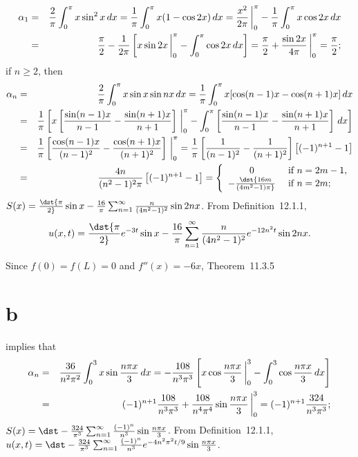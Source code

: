 \documentclass[dvips]{book}
\renewcommand{\exer}[1]{\par\medskip\;\noindent{\color{red}\bf #1.}}
\numberwithin{example}{section}
\numberwithin{equation}{section}
\numberwithin{theorem}{section}
\numberwithin{table}{section}
\numberwithin{figure}{section}
\newcommand{\lims}[2]{\,\bigg|_{#1}^{#2}}
\begin{document}
\exer{12.1.10}
\begin{eqnarray*}
\alpha_1&=&{2\over\pi}\int_0^\pi x\sin^2 x\,dx=
{1\over \pi}\int_0^\pi x(1-\cos2x)\,dx
={x^2\over2\pi}\lims0\pi
-{1\over\pi}\int_0^\pi x\cos2x\,dx\\
&=&{\pi\over2}-{1\over2\pi}\left[x\sin2x\lims0\pi-\int_0^\pi
\cos2x\,dx\right]
={\pi\over2}+{\sin2x\over4\pi}\lims0\pi={\pi\over2};
\end{eqnarray*}
if $n\ge2$, then
\begin{eqnarray*}
\alpha_n&=&
{2\over\pi}\int_0^\pi x\sin x\sin nx\,dx
={1\over\pi}\int_0^\pi x[\cos(n-1)x-\cos(n+1)x]\,dx\\
&=&{1\over\pi}\left[x\left[{\sin(n-1)x\over n-1}-
{\sin(n+1)x\over n+1}\right]\lims0\pi-\int_0^\pi
\left[{\sin(n-1)x\over n-1}-{\sin(n+1)x\over n+1}\right]\,dx\right]\\
&=&{1\over\pi}\left[{\cos(n-1)x \over(n-1)^2}
-{\cos(n+1)x\over(n+1)^2}\right]\lims0\pi
={1\over\pi}\left[{1\over(n-1)^2}-{1\over(n+1)^2}\right]
\left[(-1)^{n+1}-1\right]\\
&=&{4n\over(n^2-1)^2\pi}\left[(-1)^{n+1}-1\right]=
\left\{\begin{array}{cl}
0& \mbox{ if }n=2m-1,\\
-\dst{16m\over(4m^2-1)\pi}&\mbox{ if }n=2m;
\end{array}\right.
\end{eqnarray*}
$S(x)=\dst{\pi\over2}\sin
x-{16\over\pi}\sum_{n=1}^\infty{n\over(4n^2-1)^2}\sin2nx$.
From Definition~12.1.1,
$$
u(x,t)=\dst{\pi\over2}e^{-3t}\sin
x-{16\over\pi}\sum_{n=1}^\infty{n\over(4n^2-1)^2}e^{-12n^2t}\sin2nx.
$$



\exer{12.1.12}
Since $f(0)=f(L)=0$ and $f''(x)=-6x$, Theorem~11.3.5\part{b}
implies that
\begin{eqnarray*}
\alpha_n&=&
{36\over n^2\pi^2}\int_0^3x\sin{n\pi x\over 3}\,dx
=-{108\over n^3\pi^3}\left[x\cos{n\pi x\over 3}\lims03
-\int_0^3\cos{n\pi x\over 3}\,dx\right]\\
&=&(-1)^{n+1}{108\over n^3\pi^3}+
{108\over n^4\pi^4}\sin{n\pi x\over 3}\lims03=
(-1)^{n+1}{324\over n^3\pi^3};
\end{eqnarray*}
$S(x)=\dst-{324\over\pi^3}\sum_{n=1}^\infty{(-1)^n\over n^3}
\sin{n\pi x\over 3}$.
From Definition~12.1.1,
$u(x,t)=\dst-{324\over\pi^3}\sum_{n=1}^\infty{(-1)^n\over
n^3}
e^{-4n^2\pi^2t/9}\sin{n\pi x\over 3}$.
\end{document}
